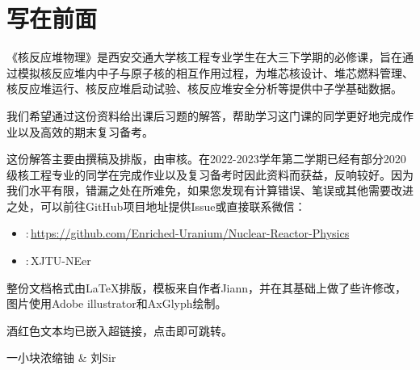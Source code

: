 \chapter*{写在前面}

《核反应堆物理》是西安交通大学核工程专业学生在大三下学期的必修课，旨在通过模拟核反应堆内中子与原子核的相互作用过程，为堆芯核设计、堆芯燃料管理、核反应堆运行、核反应堆启动试验、核反应堆安全分析等提供中子学基础数据。

我们希望通过这份资料给出课后习题的解答，帮助学习这门课的同学更好地完成作业以及高效的期末复习备考。

这份解答主要由\;撰稿及排版，由\;审核。在2022-2023学年第二学期已经有部分2020级核工程专业的同学在完成作业以及复习备考时因此资料而获益，反响较好。因为我们水平有限，错漏之处在所难免，如果您发现有计算错误、笔误或其他需要改进之处，可以前往GitHub项目地址提供Issue或直接联系微信：

\begin{itemize}
    \item {\faGithub}:\,\href{https://github.com/Enriched-Uranium/Nuclear-Reactor-Physics}{https://github.com/Enriched-Uranium/Nuclear-Reactor-Physics}
    \item {\faWeixin}:\,XJTU-NEer
\end{itemize}

整份文档格式由\LaTeX{}排版，模板来自\href{https://zhuanlan.zhihu.com/p/601085820}{\faZhihu}作者Jiann，并在其基础上做了些许修改，图片使用Adobe illustrator和AxGlyph绘制。

酒红色文本均已嵌入超链接，点击即可跳转。

\begin{flushright}
    {\kaishu 一小块浓缩铀 \& 刘Sir} \\
    \zhtoday
\end{flushright}
